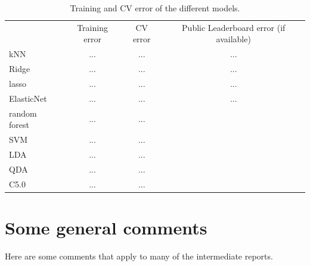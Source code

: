 \documentclass[
]{article}
\begin{document}
\begin{table} 
\begin{center}
\begin{tabular}{|l|c|c|c|} \hline
& Training error & CV error & Public Leaderboard error (if available)\\
  kNN & ... & ... & ...\\
  Ridge & ... & ... & ...\\
  lasso & ... & ... & ...\\
  ElasticNet & ... & ... & ... \\
  random forest & ... & ... \\
  SVM & ... & ... \\
  LDA & ... & ... \\
  QDA & ... & ... \\
  C5.0 & ... & ... \\
  
\hline
\end{tabular}
\end{center}
\caption{Training and CV error of the different models.} \label{tab_res}
\end{table}

\section{Some general comments}

Here are some comments that apply to many of the intermediate reports.
\end{document}
